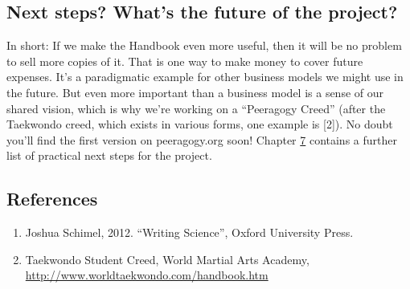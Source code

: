 \hypertarget{next-steps-whats-the-future-of-the-project}{%
\subsection{Next steps? What's the future of the
project?}\label{next-steps-whats-the-future-of-the-project}}

In short: If we make the Handbook even more useful, then it will be no
problem to sell more copies of it. That is one way to make money to
cover future expenses. It's a paradigmatic example for other business
models we might use in the future. But even more important than a
business model is a sense of our shared vision, which is why we're
working on a ``Peeragogy Creed'' (after the Taekwondo creed, which
exists in various forms, one example is {[}2{]}). No doubt you'll find
the first version on peeragogy.org soon! Chapter
\href{./distributed_roadmap.html}{7} contains a further list of
practical next steps for the project.

\hypertarget{references}{%
\subsection{References}\label{references}}

\begin{enumerate}
\def\labelenumi{\arabic{enumi}.}
\item
  Joshua Schimel, 2012. ``Writing Science'', Oxford University Press.
\item
  Taekwondo Student Creed, World Martial Arts Academy,
  \url{http://www.worldtaekwondo.com/handbook.htm}
\end{enumerate}
